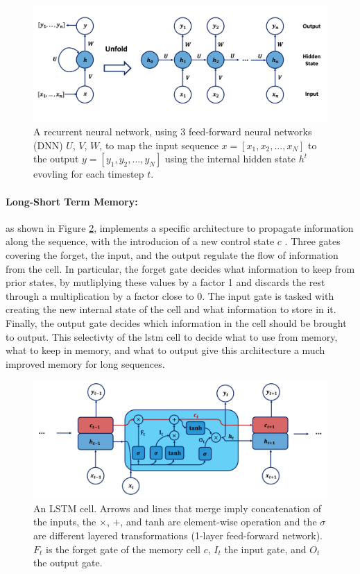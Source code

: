 \begin{figure}[h!]
    \center
    \includegraphics[scale=0.5]{Images/ML/rnn.png}
    \caption{A recurrent neural network, using 3 feed-forward neural networks (DNN) $U$, $V$, $W$, to map the input sequence $x = [x_1, x_2, ..., x_N]$ to the output $y = [y_1, y_2, ..., y_N]$ using the internal hidden state $h^t$ evovling for each timestep $t$.} 
    \label{fig:rnnNet}
\end{figure}

\paragraph{Long-Short Term Memory:} as shown in Figure \ref{fig:lstmCell}, implements a specific architecture to propagate information along the sequence, with the introducion of a new control state $c$ \cite{lstmPaper}. Three gates covering the forget, the input, and the output regulate the flow of information from the cell. In particular, the forget gate decides what information to keep from prior states, by mutliplying these values by a factor 1 and discards the rest through a multiplication by a factor close to 0. The input gate is tasked with creating the new internal state of the cell and what information to store in it.  Finally, the output gate decides which information in the cell should be brought to output. This selectivty of the \gls{lstm} cell to decide what to use from memory, what to keep in memory, and what to output give this architecture a much improved memory for long sequences. 

\begin{figure}[h!]
    \center
    \includegraphics[scale=0.5]{Images/ML/lstm.png}
    \caption{An LSTM cell. Arrows and lines that merge imply concatenation of the inputs, the $\times$, $+$, and tanh are element-wise operation and the $\sigma$ are different layered transformations (1-layer feed-forward network). $F_t$ is the forget gate of the memory cell $c$, $I_t$ the input gate, and $O_t$ the output gate. } 
    \label{fig:lstmCell}
\end{figure}

